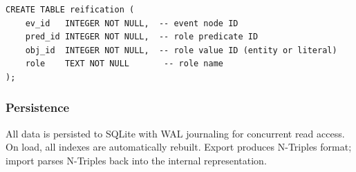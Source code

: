 \begin{verbatim}
CREATE TABLE reification (
    ev_id   INTEGER NOT NULL,  -- event node ID
    pred_id INTEGER NOT NULL,  -- role predicate ID
    obj_id  INTEGER NOT NULL,  -- role value ID (entity or literal)
    role    TEXT NOT NULL       -- role name
);
\end{verbatim}

\subsubsection{Persistence}

All data is persisted to SQLite with WAL journaling for concurrent read access. On load, all indexes are automatically rebuilt. Export produces N-Triples format; import parses N-Triples back into the internal representation.
